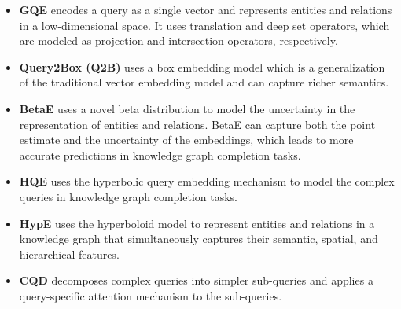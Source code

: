 \documentclass{article} %
\begin{document}
\begin{itemize}[noitemsep,leftmargin=*]
    \item \textbf{GQE} \citep{hamilton2018embedding} encodes a query as a single vector and represents entities and relations in a low-dimensional space. It uses translation and deep set operators, which are modeled as projection and intersection operators, respectively.
    \item \textbf{Query2Box (Q2B)} \citep{ren2020query2box} uses a box embedding model which is a generalization of the traditional vector embedding model and can capture richer semantics.
    \item \textbf{BetaE} \citep{ren2020beta} uses a novel beta distribution to model the uncertainty in the representation of entities and relations. BetaE can capture both the point estimate and the uncertainty of the embeddings, which leads to more accurate predictions in knowledge graph completion tasks.
    \item \textbf{HQE} \citep{choudhary2021self} uses the hyperbolic query embedding mechanism to model the complex queries in knowledge graph completion tasks. 
    \item \textbf{HypE} \citep{choudhary2021self} uses the hyperboloid model to represent entities and relations in a knowledge graph that simultaneously captures their semantic, spatial, and hierarchical features.
    \item \textbf{CQD} \citep{arakelyan2021complex} decomposes complex queries into simpler sub-queries and applies a query-specific attention mechanism to the sub-queries.
\end{itemize}
\end{document}
